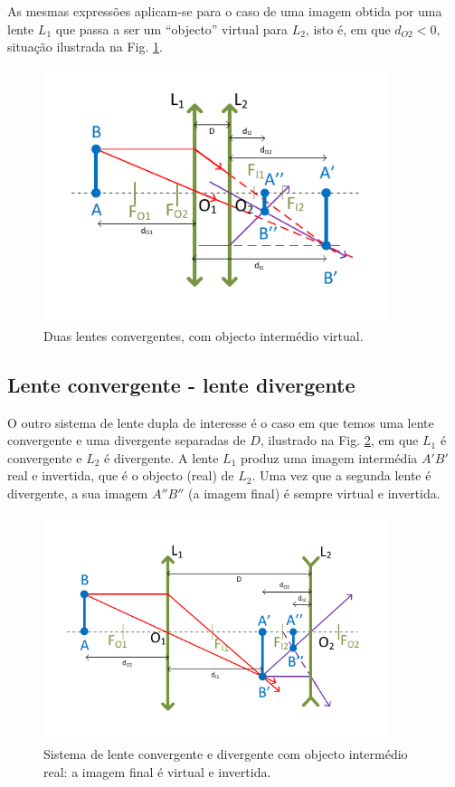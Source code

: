 \documentclass[a4paper,12pt]{article}      %
\begin{document}
As mesmas expressões aplicam-se para o caso de uma imagem obtida por uma lente $L_1$ que passa a ser um “objecto” virtual para $L_2$, isto é, em que $d_{O2}<0$, situação ilustrada na Fig. \ref{fig:DuplaConvConv2}.

\begin{figure}	[!htb]  \centering 
	\includegraphics[width=0.9\textwidth]{10-DuplaConvConv2}
	\caption{Duas lentes convergentes, com objecto intermédio virtual. \label{fig:DuplaConvConv2}} 
\end{figure}

\subsection{\sf Lente convergente - lente divergente}
O outro sistema de lente dupla de interesse é o caso em que temos uma lente convergente e uma divergente separadas de $D$, ilustrado na Fig. \ref{fig:DuplaConvDiv1}, em que $L_1$ é convergente e $L_2$ é divergente. A lente $L_1$ produz uma imagem intermédia $A'B'$ real e invertida, que é o objecto (real) de $L_2$. Uma vez que a segunda lente é divergente, a sua imagem $A''B''$ (a imagem final) é sempre virtual e invertida.

\begin{figure}	[!htb]  \centering 
	\includegraphics[width=0.9\textwidth]{11-DuplaConvDiv1}
	\caption{Sistema de lente convergente e divergente  com objecto intermédio real: a imagem final é virtual e invertida. \label{fig:DuplaConvDiv1}} 
\end{figure}
\end{document}
